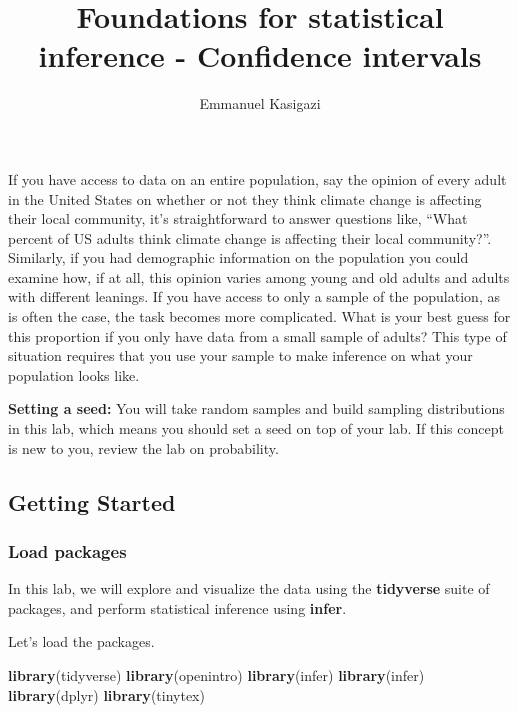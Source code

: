 \documentclass[
]{article}
\title{Foundations for statistical inference - Confidence intervals}
\author{Emmanuel Kasigazi}
\date{}
\newenvironment{Shaded}{\begin{snugshade}}{\end{snugshade}}
\newcommand{\FunctionTok}[1]{\textcolor[rgb]{0.13,0.29,0.53}{\textbf{#1}}}
\newcommand{\NormalTok}[1]{#1}
\begin{document}
\maketitle

If you have access to data on an entire population, say the opinion of
every adult in the United States on whether or not they think climate
change is affecting their local community, it's straightforward to
answer questions like, ``What percent of US adults think climate change
is affecting their local community?''. Similarly, if you had demographic
information on the population you could examine how, if at all, this
opinion varies among young and old adults and adults with different
leanings. If you have access to only a sample of the population, as is
often the case, the task becomes more complicated. What is your best
guess for this proportion if you only have data from a small sample of
adults? This type of situation requires that you use your sample to make
inference on what your population looks like.

\label{boxedtext}
\textbf{Setting a seed:} You will take random samples and build sampling
distributions in this lab, which means you should set a seed on top of
your lab. If this concept is new to you, review the lab on probability.

\subsection{Getting Started}\label{getting-started}

\subsubsection{Load packages}\label{load-packages}

In this lab, we will explore and visualize the data using the
\textbf{tidyverse} suite of packages, and perform statistical inference
using \textbf{infer}.

Let's load the packages.

\begin{Shaded}
\begin{Highlighting}[]
\FunctionTok{library}\NormalTok{(tidyverse)}
\FunctionTok{library}\NormalTok{(openintro)}
\FunctionTok{library}\NormalTok{(infer)}
\FunctionTok{library}\NormalTok{(infer)}
\FunctionTok{library}\NormalTok{(dplyr)}
\FunctionTok{library}\NormalTok{(tinytex)}
\end{Highlighting}
\end{Shaded}
\end{document}
